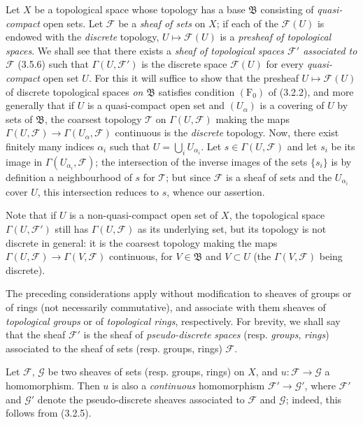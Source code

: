 \begin{env}[3.8.1]
\label{0.3.8.1}
Let $X$ be a topological space whose topology has a base
$\mathfrak{B}$ consisting of \emph{quasi-compact} open sets. Let
$\mathcal{F}$ be a \emph{sheaf of sets} on $X$; if each of the
$\mathcal{F}(U)$ is endowed with the \emph{discrete} topology,
$U\mapsto\mathcal{F}(U)$ is a \emph{presheaf of topological spaces}.
We shall see that there exists a \emph{sheaf of topological spaces
$\mathcal{F}'$ associated to $\mathcal{F}$} (3.5.6) such that
$\Gamma(U,\mathcal{F}')$ is the discrete space $\mathcal{F}(U)$ for every
\emph{quasi-compact} open set $U$. For this it will suffice to show that the
presheaf $U\mapsto\mathcal{F}(U)$ of discrete topological spaces
\emph{on $\mathfrak{B}$} satisfies condition $(\mathrm{F}_0)$ of (3.2.2),
and more generally that if $U$ is a quasi-compact open set and
$(U_\alpha)$ is a covering of $U$ by sets of $\mathfrak{B}$,
the coarsest topology $\mathcal{T}$ on $\Gamma(U,\mathcal{F})$ making
the maps
$\Gamma(U,\mathcal{F})\to\Gamma(U_\alpha,\mathcal{F})$ continuous is the
\emph{discrete} topology. Now, there exist finitely many indices $\alpha_i$ such that
$U=\bigcup_i U_{\alpha_i}$. Let $s\in\Gamma(U,\mathcal{F})$ and let $s_i$ be its
image in $\Gamma(U_{\alpha_i},\mathcal{F})$; the intersection of the inverse
images of the sets $\{s_i\}$ is by definition a neighbourhood of $s$
for $\mathcal{T}$; but since $\mathcal{F}$ is a sheaf of sets and
the $U_{\alpha_i}$ cover $U$, this intersection reduces to $s$,
whence our assertion.

Note that if $U$ is a non-quasi-compact open set of $X$, the topological
space $\Gamma(U,\mathcal{F}')$ still has $\Gamma(U,\mathcal{F})$ as its
underlying set, but its topology is not discrete in general:
it is the coarsest topology making the maps
$\Gamma(U,\mathcal{F})\to\Gamma(V,\mathcal{F})$ continuous, for $V\in\mathfrak{B}$ and
$V\subset U$ (the $\Gamma(V,\mathcal{F})$ being discrete).

The preceding considerations apply without modification to sheaves
of groups or of rings (not necessarily commutative), and associate with them
sheaves of \emph{topological groups} or of \emph{topological rings},
respectively. For brevity, we shall say that the sheaf $\mathcal{F}'$ is the
sheaf of \emph{pseudo-discrete} \emph{spaces} (resp. \emph{groups},
\emph{rings}) associated to the sheaf of sets (resp. groups,
rings) $\mathcal{F}$.
\end{env}

\begin{env}[3.8.2]
\label{0.3.8.2}
Let $\mathcal{F}$, $\mathcal{G}$ be two sheaves of sets (resp. groups,
rings) on $X$, and $u:\mathcal{F}\to\mathcal{G}$ a homomorphism. Then $u$
is also a \emph{continuous} homomorphism $\mathcal{F}'\to\mathcal{G}'$, where
$\mathcal{F}'$ and $\mathcal{G}'$ denote the pseudo-discrete sheaves
associated to $\mathcal{F}$ and $\mathcal{G}$; indeed, this follows from
(3.2.5).
\end{env}

